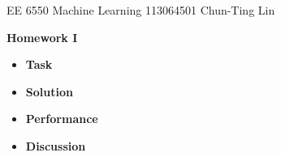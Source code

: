 \documentclass[letterpaper,12pt]{article}
\begin{document}
  \noindent EE 6550 Machine Learning \hfill 113064501  Chun-Ting Lin \\

  \begin{center}
    {\bf \large  Homework I}
  \end{center}


  \begin{itemize}
    \item \textbf{Task} \hfill \\
        
    \item \textbf{Solution} \hfill \\
        
    \item \textbf{Performance} \hfill \\
        
    \item \textbf{Discussion} \hfill \\
        
  \end{itemize}
\end{document}
